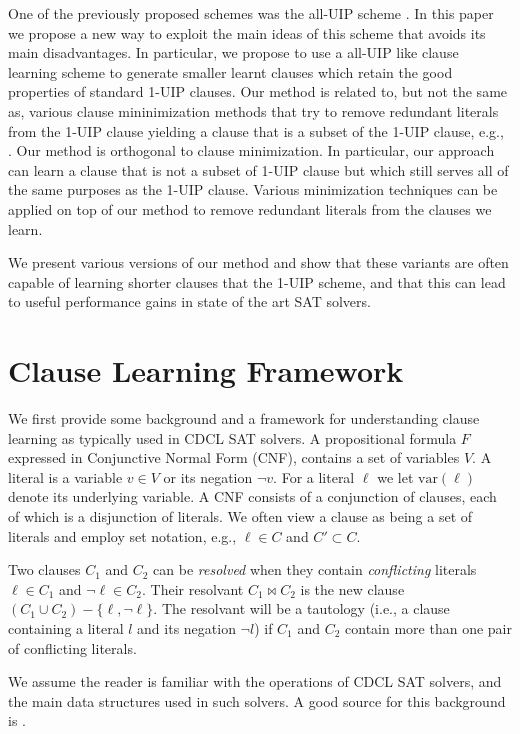\documentclass[runningheads]{llncs}
\newcommand{\sat}{SAT\xspace}
\newcommand{\var}{\text{var}}
\newcommand{\resolve}{\bowtie}
\begin{document}
One of the previously proposed schemes was the all-UIP scheme
\cite{DBLP:conf/iccad/ZhangMMM01}. In this paper we propose a new way
to exploit the main ideas of this scheme that avoids its main
disadvantages. In particular, we propose to use a all-UIP like clause
learning scheme to generate smaller learnt clauses which retain the
good properties of standard 1-UIP clauses. Our method is related to,
but not the same as, various clause mininimization methods that try to
remove redundant literals from the 1-UIP clause yielding a clause that
is a subset of the 1-UIP clause, e.g.,
\cite{DBLP:conf/sat/SorenssonB09,DBLP:conf/ijcai/LuoLXML17,DBLP:conf/sat/WieringaH13}.
Our method is orthogonal to clause minimization. In particular, our
approach can learn a clause that is not a subset of 1-UIP clause but
which still serves all of the same purposes as the 1-UIP clause.
Various minimization techniques can be applied on top of our method to
remove redundant literals from the clauses we learn.

We present various versions of our method and show that these variants
are often capable of learning shorter clauses that the 1-UIP scheme,
and that this can lead to useful performance gains in state of the art
\sat solvers.

\section{Clause Learning Framework}
We first provide some background and a framework for understanding
clause learning as typically used in CDCL \sat solvers. A
propositional formula $F$ expressed in Conjunctive Normal Form (CNF),
contains a set of variables $V$. A literal is a variable $v\in V$ or
its negation $\lnot v$. For a literal $\ell$ we let $\var(\ell)$
denote its underlying variable. A CNF consists of a conjunction of
clauses, each of which is a disjunction of literals. We often view a
clause as being a set of literals and employ set notation, e.g.,
$\ell\in C$ and $C'\subset C$. 

Two clauses $C_1$ and $C_2$ can be \emph{resolved} when they contain
\emph{conflicting} literals $\ell\in C_1$ and $\lnot \ell \in
C_2$. Their resolvant $C_1 \resolve C_2$ is the new clause
$(C_1 \cup C_2) - \{\ell, \lnot \ell\}$. The resolvant will be a
tautology (i.e., a clause containing a literal $l$ and its negation
$\lnot l$) if $C_1$ and $C_2$ contain more than one pair of
conflicting literals.

We assume the reader is familiar with the operations of CDCL \sat
solvers, and the main data structures used in such solvers. A good
source for this background is \cite{DBLP:series/faia/SilvaLM09}.
\end{document}

